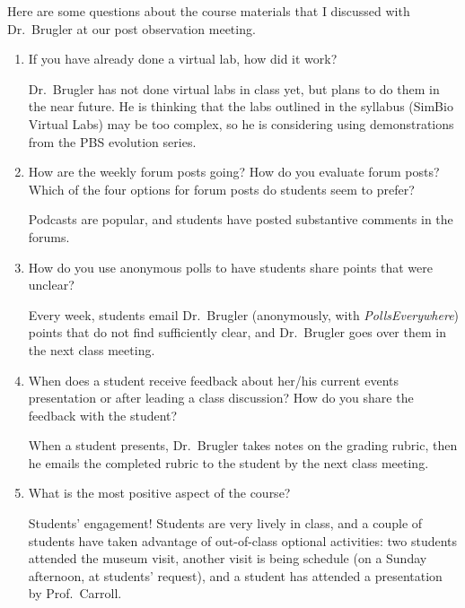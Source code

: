 \documentclass[11pt,dvipsnames]{article}
\begin{document}
Here are some questions about the course materials that I discussed with Dr.~Brugler at our post observation meeting.
\begin{enumerate}[label=\textcolor{blue}{\bf (\alph*)}]
\item If you have already done a virtual lab, how did it work?
\begin{adjustwidth}{1cm}{1cm}
Dr.~Brugler has not done virtual labs in class yet, but plans to do them in the near future. He is thinking that the labs outlined in the syllabus (SimBio
Virtual Labs) may be too complex, so he is considering using demonstrations from the PBS evolution series.
\end{adjustwidth}
\item How are the weekly forum posts going? How do you evaluate forum posts? Which of the four options for forum posts do students seem to prefer?
\begin{adjustwidth}{1cm}{1cm}
Podcasts are popular, and students have posted substantive comments in the forums. 
\end{adjustwidth}
\item How do you use anonymous polls to have students share points that were unclear?
\begin{adjustwidth}{1cm}{1cm}
Every week, students email Dr.~Brugler (anonymously, with \emph{PollsEverywhere}) points that do not find sufficiently clear, and Dr.~Brugler goes over them in the next class meeting. 
\end{adjustwidth}
\item When does a student receive feedback about her/his current events presentation or after leading a class discussion? How do you share the feedback with the student?
\begin{adjustwidth}{1cm}{1cm}
When a student presents, Dr.~Brugler takes notes on the grading rubric, then he emails the completed rubric to the student by the next class meeting.
\end{adjustwidth}
\item What is the most positive aspect of the course?
\begin{adjustwidth}{1cm}{1cm}
Students' engagement! Students are very lively in class, and a couple of students have taken advantage of out-of-class optional activities: two students attended the museum visit, another visit is being schedule (on a Sunday afternoon, at students' request), and a student has attended a presentation by Prof.~Carroll.
\end{adjustwidth}
	\end{enumerate}
\end{document}
